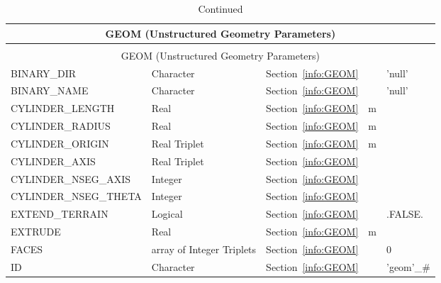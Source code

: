 \documentclass[12pt]{article}
\begin{document}
\begin{longtable}{@{\extracolsep{\fill}}|l|l|l|l|l|}
\caption[Unstructured geometry parameters ({\ct GEOM} namelist group)]{For more information see Section~\ref{info:GEOM}.}
\label{tbl:GEOM} \\
\hline
\multicolumn{5}{|c|}{{\ct GEOM} (Unstructured Geometry Parameters)} \\
\hline \hline
\endfirsthead
\caption[]{Continued} \\
\hline
\multicolumn{5}{|c|}{{\ct GEOM} (Unstructured Geometry Parameters)} \\
\hline \hline
\endhead
{\ct BINARY\_DIR}     & Character              & Section~\ref{info:GEOM}            &           &  {\ct 'null'}           \\ \hline
{\ct BINARY\_NAME}     & Character              & Section~\ref{info:GEOM}            &           &  {\ct 'null'}           \\ \hline
{\ct CYLINDER\_LENGTH}& Real                  & Section~\ref{info:GEOM}            &   m       &                      \\ \hline
{\ct CYLINDER\_RADIUS}& Real                  & Section~\ref{info:GEOM}            &   m       &                       \\ \hline
{\ct CYLINDER\_ORIGIN}& Real Triplet          & Section~\ref{info:GEOM}            &   m       &             \\ \hline
{\ct CYLINDER\_AXIS}& Real Triplet          & Section~\ref{info:GEOM}            &          &             \\ \hline
{\ct CYLINDER\_NSEG\_AXIS}& Integer          & Section~\ref{info:GEOM}            &          &             \\ \hline
{\ct CYLINDER\_NSEG\_THETA}& Integer          & Section~\ref{info:GEOM}            &          &             \\ \hline
{\ct EXTEND\_TERRAIN}& Logical          & Section~\ref{info:GEOM}            &          &    {\ct .FALSE.}         \\ \hline
{\ct EXTRUDE}& Real                  & Section~\ref{info:GEOM}            &   m       &                    \\ \hline
{\ct FACES}        & array of Integer Triplets     & Section~\ref{info:GEOM}     &           &    0                     \\ \hline
{\ct ID}           & Character              & Section~\ref{info:GEOM}            &           &   {\ct 'geom'\_\#}           \\ \hline

\end{longtable}
\end{document}
